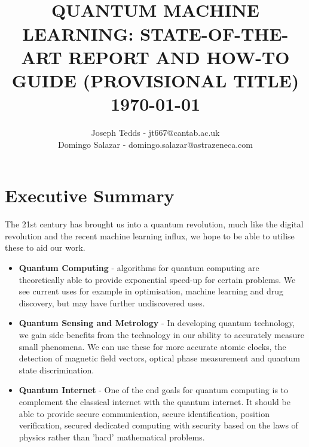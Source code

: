\documentclass{article}
\title{
			\HRule{0.5pt} \\						%
			\LARGE \textbf{\uppercase{Quantum Machine Learning: State-of-the-Art Report and How-to Guide (Provisional Title)}}	%
			\HRule{2pt} \\ [0.5cm]		%
			\normalsize \today			%
		}
\author{Joseph Tedds - jt667@cantab.ac.uk \\
 Domingo Salazar - domingo.salazar@astrazeneca.com}
\theoremstyle{definition}
\begin{document}
\maketitle
\clearpage



\section{Executive Summary}
The 21st century has brought us into a quantum revolution, much like the digital revolution and the recent machine learning influx, we hope to be able to utilise these to aid our work.

\begin{itemize}
\item \textbf{Quantum Computing} - algorithms for quantum computing are theoretically able to provide exponential speed-up for certain problems. We see current uses for example in optimisation, machine learning and drug discovery, but may have further undiscovered uses.
\item \textbf{Quantum Sensing and Metrology} - In developing quantum technology, we gain side benefits from the technology in our ability to accurately measure small phenomena. We can use these for more accurate atomic clocks, the detection of magnetic field vectors, optical phase measurement and quantum state discrimination. 
\item \textbf{Quantum Internet} - One of the end goals for quantum computing is to complement the classical internet with the quantum internet. It should be able to provide secure communication, secure identification, position verification, secured dedicated computing with security based on the laws of physics rather than 'hard' mathematical problems.
\end{itemize}
\end{document}

